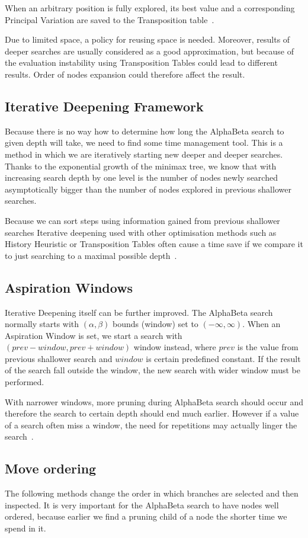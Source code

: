 When an arbitrary position is fully explored, its best value and a
corresponding Principal Variation are saved to the Transposition
table~\cite{COX}.

Due to limited space, a policy for reusing space is needed. Moreover, results
of deeper searches are usually considered as a good approximation, but because
of the evaluation instability using Transposition Tables could lead to
different results. Order of nodes expansion could therefore affect the result.

\subsection{Iterative Deepening Framework}
Because there is no way how to determine how long the AlphaBeta search to
given depth will take, we need to find some time management tool. This is a
method in which we are iteratively starting new deeper and deeper searches.
Thanks to the exponential growth of the minimax tree, we know that with
increasing search depth by one level is the number of nodes newly searched
asymptotically bigger than the number of nodes explored in previous shallower
searches.

Because we can sort steps using information gained from previous shallower
searches Iterative deepening used with other optimisation methods such as
History Heuristic or Transposition Tables often cause a time save if we compare
it to just searching to a maximal possible depth~\cite{COX}.

\subsection{Aspiration Windows}
Iterative Deepening itself can be further improved. The AlphaBeta search
normally starts with $(\alpha,\beta)$ bounds (window) set to
$(-\infty,\infty)$. When an Aspiration Window is set, we start a search with
$(prev - window, prev + window)$ window instead, where $prev$ is the value from
previous shallower search and $window$ is certain predefined constant. If the
result of the search fall outside the window, the new search with wider window
must be performed.

With narrower windows, more pruning during AlphaBeta search should occur and
therefore the search to certain depth should end much earlier. However if a
value of a search often miss a window, the need for repetitions may actually
linger the search~\cite{AspirationWindow}.

\subsection{Move ordering}
The following methods change the order in which branches are selected and then
inspected. It is very important for the AlphaBeta search to have nodes well
ordered, because earlier we find a pruning child of a node the shorter time
we spend in it.

